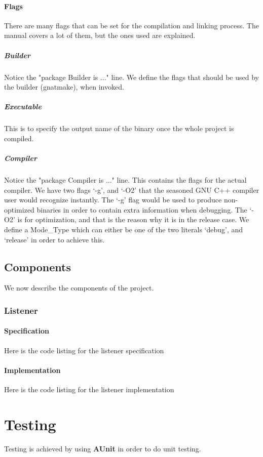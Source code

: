 

\paragraph{Flags} There are many flags that can be set for the compilation and linking process. The manual covers a lot of them, but the ones used are explained.

\subparagraph{Builder} Notice the "package Builder is ..." line. We define the flags that should be used by the builder (gnatmake), when invoked.

\subparagraph{Executable} This is to specify the output name of the binary once the whole project is compiled.

\subparagraph{Compiler} Notice the "package Compiler is ..." line. This contains the flags for the actual compiler. We have two flags `-g', and `-O2' that the seasoned GNU C++ compiler user would recognize instantly. The `-g' flag would be used to produce non-optimized binaries in order to contain extra information when debugging. 
The `-O2' is for optimization, and that is the reason why it is in the release case. We define a Mode\_Type which can either be one of the two literals `debug', and `release' in order to achieve this. 

\subsection{Components}
We now describe the components of the project. 

\subsubsection{Listener}
\paragraph{Specification} Here is the code listing for the listener specification


\paragraph{Implementation} Here is the code listing for the listener implementation


\section{Testing}
Testing is achieved by using \textbf{AUnit} in order to do unit testing. 
